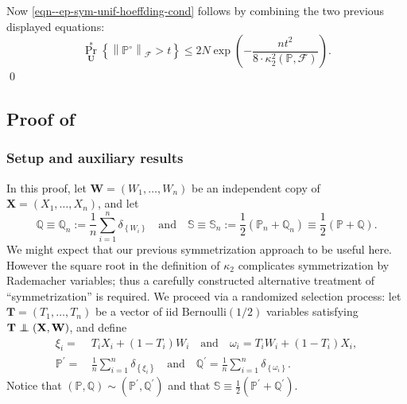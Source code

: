 Now \eqref{eqn--ep-sym-unif-hoeffding-cond} follows by combining the two
previous displayed equations:
\begin{equation*}
  \Pr_{\mathbf{U}}^{\ast} \left\{ \left\| \mathbb{P}^{\circ}
  \right\|_{\mathcal{F}} > t \right\} \leq
  2 N \exp \left( - \frac{n t^{2}}{8 \cdot \kappa_{2}^{2} (\mathbb{P},
  \mathcal{F})} \right).
\end{equation*}
\qed

\subsection{Proof of
\texorpdfstring{}{Lemma
\ref{lem--sqrt-ep-2nd-moment-sup-pbound}}}
\label{sec--prf--lem--sqrt-ep-2nd-moment-sup-pbound}

\subsubsection{Setup and auxiliary results}

In this proof, let \(\mathbf{W} = \left( W_{1}, \dots, W_{n} \right)\) be an
independent copy of \(\mathbf{X} = \left( X_{1}, \dots, X_{n} \right)\), and let
\begin{equation}
  \mathbb{Q} \equiv \mathbb{Q}_{n} := \frac{1}{n} \sum_{i = 1}^{n}
  \delta_{\left\{ W_{i} \right\}} \quad \text{and} \quad \mathbb{S} \equiv
  \mathbb{S}_{n} := \frac{1}{2} \left( \mathbb{P}_{n} + \mathbb{Q}_{n} \right)
  \equiv \frac{1}{2} \left( \mathbb{P} + \mathbb{Q} \right).
\end{equation}
We might expect that our previous symmetrization approach to be useful here.
However the square root in the definition of \(\kappa_{2}\) complicates
symmetrization by Rademacher variables; thus a carefully constructed alternative
treatment of ``symmetrization'' is required.
We proceed via a randomized selection process: let \(\mathbf{T} = \left( T_{1},
\dots, T_{n} \right)\) be a vector of iid \(\mathrm{Bernoulli} (1 / 2)\)
variables satisfying \(\mathbf{T} \mathrel{\perp \mspace{-11mu} \perp} (\mathbf{X}, \mathbf{W})\), and define
\begin{equation}
  \begin{split}
    \xi_{i} =
    & \, T_{i} X_{i} + \left( 1 - T_{i} \right) W_{i} \quad \text{and} \quad
    \omega_{i} = T_{i} W_{i} + \left( 1 - T_{i} \right) X_{i}, \\
    \mathbb{P}^{\prime} =
    & \, \frac{1}{n} \sum_{i = 1}^{n} \delta_{\left\{ \xi_{i} \right\}} \quad
    \text{and} \quad \mathbb{Q}^{\prime} = \frac{1}{n} \sum_{i = 1}^{n}
    \delta_{\left\{ \omega_{i} \right\}}.
  \end{split}
\end{equation}
Notice that \((\mathbb{P}, \mathbb{Q}) \sim \left( \mathbb{P}^{\prime},
\mathbb{Q}^{\prime} \right)\) and that \(\mathbb{S} \equiv \frac{1}{2} \left(
\mathbb{P}^{\prime} + \mathbb{Q}^{\prime} \right)\).

